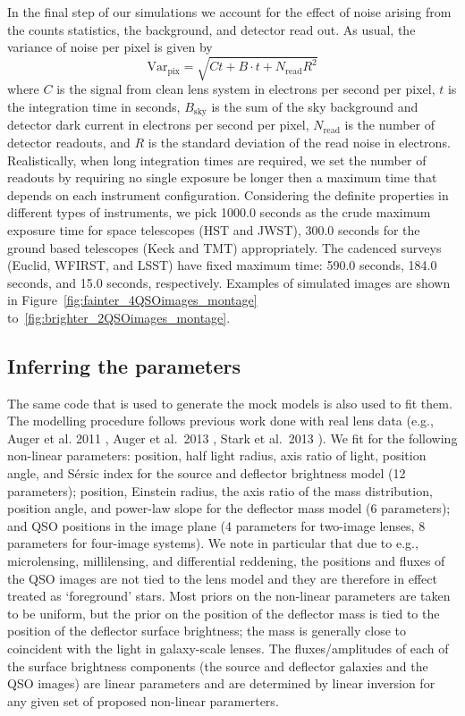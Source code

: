 \documentclass[a4paper,11pt]{article}
\begin{document}
In the final step of our simulations we account for the effect of
noise arising from the counts statistics, the background, and detector
read out. As usual, the variance of noise per pixel is given by
%
\begin{equation}
   \label{eq:noise}
   \mathrm{Var}_{\mathrm{pix}} = \sqrt{Ct+B\cdot t + N_{\mathrm{read}} R^{2}}
\end{equation}
%
where $C$ is the signal from clean lens system in electrons per second
per pixel, $t$ is the integration time in seconds, $B_{\mathrm{sky}}$
is the sum of the sky background and detector dark current in
electrons per second per pixel, $N_{\mathrm{read}}$ is the number of
detector readouts, and $R$ is the standard deviation of the read noise
in electrons. Realistically, when long integration times are required,
we set the number of readouts by requiring no single exposure be
longer then a maximum time that depends on each instrument
configuration. Considering the definite properties in different types of instruments, we pick 1000.0 seconds as the crude maximum exposure time for space telescopes (HST and JWST), 300.0 seconds for the ground based telescopes (Keck and TMT) appropriately. The cadenced surveys (Euclid, WFIRST, and LSST) have fixed maximum time: 590.0 seconds, 184.0 seconds, and 15.0 seconds, respectively.
Examples of simulated images are shown in
Figure~\ref{fig:fainter_4QSOimages_montage}
to~\ref{fig:brighter_2QSOimages_montage}.

\subsection{Inferring the parameters}
\label{ssec:inf}

The same code that is used to generate the mock models is also used to fit them. The
modelling procedure follows previous work done with real lens data (e.g., Auger et al. 2011
\cite{2011MNRAS.411L...6A}, Auger et al.~2013 \cite{2013MNRAS.436..503A}, Stark et al.~2013
\cite{2013MNRAS.436.1040S}).
We fit for the following non-linear parameters: position, half light radius, axis
ratio of light, position angle, and S{\'e}rsic index for the
source and deflector brightness model (12 parameters); position, Einstein radius, the
axis ratio of the mass distribution, position angle, and power-law
slope for the deflector mass model (6 parameters); and QSO positions in the image
plane (4 parameters for two-image lenses, 8 parameters for four-image systems). We note in particular
that due to e.g., microlensing, millilensing, and differential reddening, the
positions and fluxes of the QSO images are not tied to the lens model and
they are therefore in effect treated as `foreground' stars. Most priors on the non-linear
parameters are taken to be uniform, but the prior on the position of the deflector
mass is tied to the position of the deflector surface brightness;
the mass is generally close to coincident with the light in galaxy-scale lenses.
The fluxes/amplitudes of each of the surface brightness components
(the source and deflector galaxies and the QSO images) are linear parameters and are determined
by linear inversion for any given set of proposed non-linear paramerters.
\end{document}
